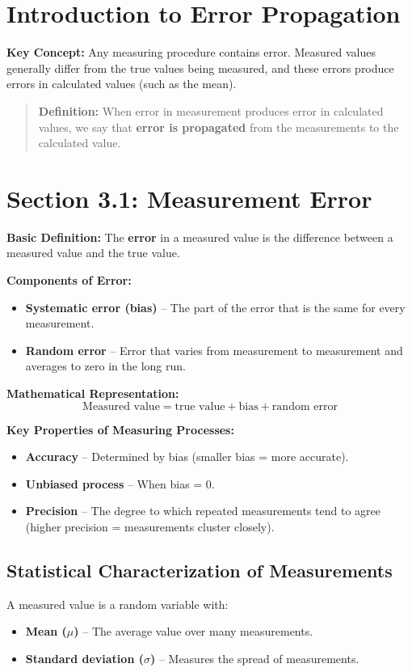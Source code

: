 \documentclass[11pt]{article}
\begin{document}
\section*{Introduction to Error Propagation}
\textbf{Key Concept:} Any measuring procedure contains error. Measured values generally differ from the true values being measured, and these errors produce errors in calculated values (such as the mean).

\begin{quote}
\textbf{Definition:} When error in measurement produces error in calculated values, we say that \textbf{error is propagated} from the measurements to the calculated value.
\end{quote}

\section*{Section 3.1: Measurement Error}
\textbf{Basic Definition:} The \textbf{error} in a measured value is the difference between a measured value and the true value.

\textbf{Components of Error:}
\begin{itemize}[nosep]
    \item \textbf{Systematic error (bias)} – The part of the error that is the same for every measurement.
    \item \textbf{Random error} – Error that varies from measurement to measurement and averages to zero in the long run.
\end{itemize}

\textbf{Mathematical Representation:}
\[
\text{Measured value} = \text{true value} + \text{bias} + \text{random error}
\]

\textbf{Key Properties of Measuring Processes:}
\begin{itemize}[nosep]
    \item \textbf{Accuracy} – Determined by bias (smaller bias = more accurate).
    \item \textbf{Unbiased process} – When bias = 0.
    \item \textbf{Precision} – The degree to which repeated measurements tend to agree (higher precision = measurements cluster closely).
\end{itemize}

\subsection*{Statistical Characterization of Measurements}
A measured value is a random variable with:
\begin{itemize}[nosep]
    \item \textbf{Mean (\(\mu\))} – The average value over many measurements.
    \item \textbf{Standard deviation (\(\sigma\))} – Measures the spread of measurements.
\end{itemize}
\end{document}
